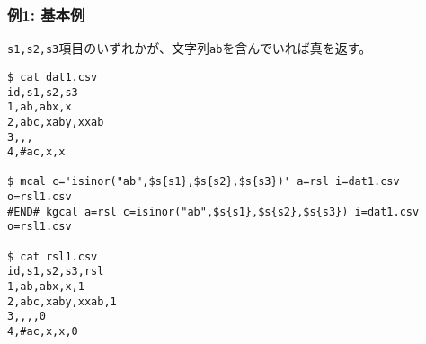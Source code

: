 
\subsubsection*{例1: 基本例}

\verb|s1,s2,s3|項目のいずれかが、文字列\verb|ab|を含んでいれば真を返す。

\begin{Verbatim}[baselinestretch=0.7,frame=single]
$ cat dat1.csv
id,s1,s2,s3
1,ab,abx,x
2,abc,xaby,xxab
3,,,
4,#ac,x,x

$ mcal c='isinor("ab",$s{s1},$s{s2},$s{s3})' a=rsl i=dat1.csv o=rsl1.csv
#END# kgcal a=rsl c=isinor("ab",$s{s1},$s{s2},$s{s3}) i=dat1.csv o=rsl1.csv

$ cat rsl1.csv
id,s1,s2,s3,rsl
1,ab,abx,x,1
2,abc,xaby,xxab,1
3,,,,0
4,#ac,x,x,0
\end{Verbatim}
